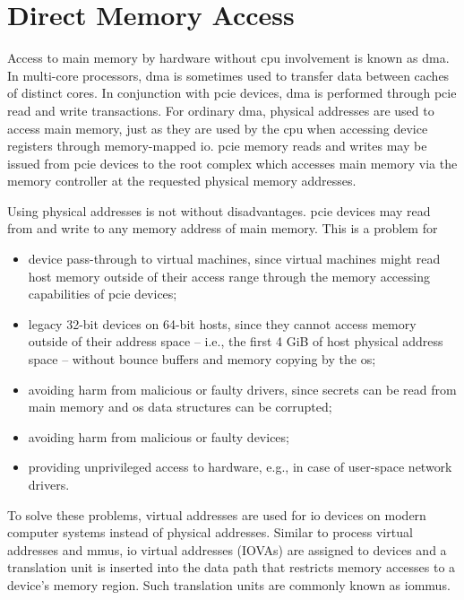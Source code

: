 \section{Direct Memory Access}
\label{sec:dma}

Access to main memory by hardware without \ac{cpu} involvement is known as
\acf{dma}. In multi-core processors, \ac{dma} is sometimes used to transfer data
between caches of distinct cores. In conjunction with \ac{pcie} devices,
\ac{dma} is performed through \ac{pcie} read and write transactions. For
ordinary \ac{dma}, physical addresses are used to access main memory, just as
they are used by the \ac{cpu} when accessing device registers through
memory-mapped \ac{io}. \ac{pcie} memory reads and writes may be issued from
\ac{pcie} devices to the root complex which accesses main memory via the memory
controller at the requested physical memory addresses.

Using physical addresses is not without disadvantages. \ac{pcie} devices may
read from and write to any memory address of main memory. This is a problem for

\begin{itemize}
    \item device pass-through to virtual machines, since virtual machines might
        read host memory outside of their access range through the memory
        accessing capabilities of \ac{pcie} devices;
    \item legacy 32-bit devices on 64-bit hosts, since they cannot access memory
        outside of their address space -- i.e., the first 4 GiB of host physical
        address space -- without bounce buffers and memory copying by the
        \ac{os};
    \item avoiding harm from malicious or faulty drivers, since secrets can be
        read from main memory and \ac{os} data structures can be corrupted;
    \item avoiding harm from malicious or faulty devices;
    \item providing unprivileged access to hardware, e.g., in case of user-space
        network drivers.
\end{itemize}

To solve these problems, virtual addresses are used for \ac{io} devices on
modern computer systems instead of physical addresses. Similar to process
virtual addresses and \acp{mmu}, \ac{io} virtual addresses (IOVAs) are assigned
to devices and a translation unit is inserted into the data path that restricts
memory accesses to a device's memory region. Such translation units are commonly
known as \acfp{iommu}.


